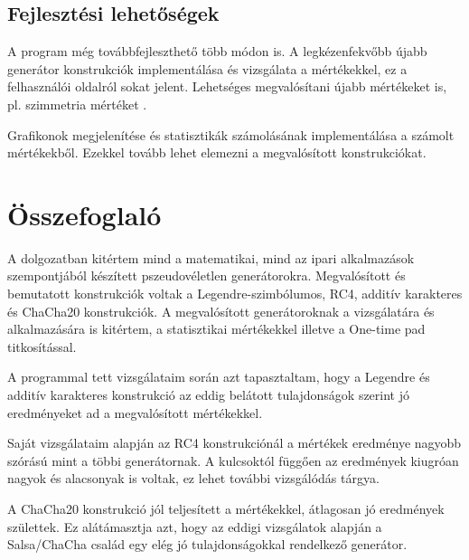 \documentclass[hidelinks, 12pt]{article}
\begin{document}
\subsection{Fejlesztési lehetőségek}
A program még továbbfejleszthető több módon is. A legkézenfekvőbb újabb generátor konstrukciók implementálása és vizsgálata a mértékekkel, ez a felhasználói oldalról sokat jelent. Lehetséges megvalósítani újabb mértékeket is, pl. szimmetria mértéket \cite{symmetry}.

Grafikonok megjelenítése és statisztikák számolásának implementálása a számolt mértékekből. Ezekkel tovább lehet elemezni a megvalósított konstrukciókat.
\section{Összefoglaló}
A dolgozatban kitértem mind a matematikai, mind az ipari alkalmazások szempontjából készített pszeudovéletlen generátorokra. Megvalósított és bemutatott konstrukciók voltak a Legendre-szimbólumos, RC4, additív karakteres és ChaCha20 konstrukciók. A megvalósított generátoroknak a vizsgálatára és alkalmazására is kitértem, a statisztikai mértékekkel illetve a One-time pad titkosítással.

A programmal tett vizsgálataim során azt tapasztaltam, hogy a Legendre és additív karakteres konstrukció az eddig belátott tulajdonságok szerint jó eredményeket ad a megvalósított mértékekkel. \cite{additive} \cite{largefam}

Saját vizsgálataim alapján az RC4 konstrukciónál a mértékek eredménye nagyobb szórású mint a többi generátornak. A kulcsoktól függően az eredmények kiugróan nagyok és alacsonyak is voltak, ez lehet további vizsgálódás tárgya.

A ChaCha20 konstrukció jól teljesített a mértékekkel, átlagosan jó eredmények születtek. Ez alátámasztja azt, hogy az eddigi vizsgálatok alapján a Salsa/ChaCha család egy elég jó tulajdonságokkal rendelkező generátor. \cite{salsaattack} \cite{salsadiffcrypt}
\end{document}
